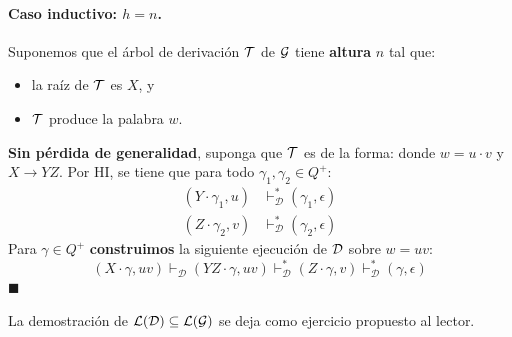 \paragraph*{Caso inductivo: $h=n$.} Suponemos que el árbol de derivación $\mathcal{T}$ de $\mathcal{G}$ tiene \textbf{altura} $n$ tal que:
\begin{itemize}
    \item la raíz de $\mathcal{T}$ es $X$, y
    \item $\mathcal{T}$ produce la palabra $w$.
\end{itemize}
\textbf{Sin pérdida de generalidad}, suponga que $\mathcal{T}$ es de la forma:
donde $w = u\cdot v$ y $X\to YZ$. Por HI, se tiene que para todo $\gamma_1, \gamma_2 \in Q^+$:
$$
    \begin{aligned}
        \left(Y \cdot \gamma_1, u\right) & \vdash_{\mathcal{D}}^*\left(\gamma_1, \epsilon\right) \\
        \left(Z \cdot \gamma_2, v\right) & \vdash_{\mathcal{D}}^*\left(\gamma_2, \epsilon\right)
    \end{aligned}
$$
Para $\gamma \in Q^+$ \textbf{construimos} la siguiente ejecución de $\mathcal{D}$ sobre $w=uv$:
$$
    (X \cdot \gamma, u v) \vdash_{\mathcal{D}}(Y Z \cdot \gamma, u v) \vdash_{\mathcal{D}}^*(Z \cdot \gamma, v) \vdash_{\mathcal{D}}^*(\gamma, \epsilon)
$$
\hfill $\blacksquare$

La demostración de $\mathcal{L}(\mathcal{D}) \subseteq \mathcal{L}(\mathcal{G})$ se deja como ejercicio propuesto al lector.



